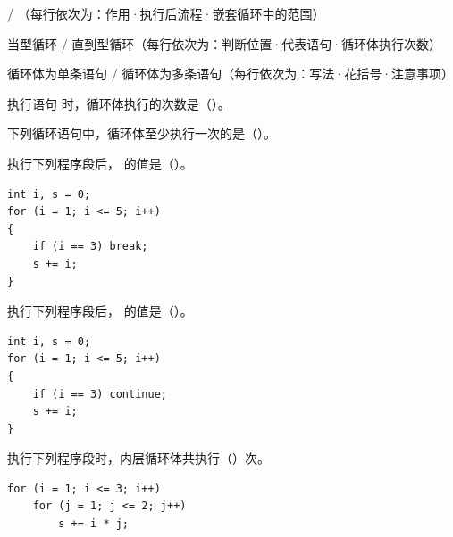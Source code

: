 \documentclass[a4paper,11pt]{article}
\begin{document}
\begin{contrast}{ / （每行依次为：作用·执行后流程·嵌套循环中的范围）}
\end{contrast}

\begin{contrast}{当型循环 / 直到型循环（每行依次为：判断位置·代表语句·循环体执行次数）}
\end{contrast}

\begin{contrast}{循环体为单条语句 / 循环体为多条语句（每行依次为：写法·花括号·注意事项）}
\end{contrast}


\q 执行语句  时，循环体执行的次数是（\quad）。

\q 下列循环语句中，循环体至少执行一次的是（\quad）。

\q 执行下列程序段后， 的值是（\quad）。
\begin{lstlisting}[language={[custom]C}]
int i, s = 0;
for (i = 1; i <= 5; i++)
{
    if (i == 3) break;
    s += i;
}
\end{lstlisting}

\q 执行下列程序段后， 的值是（\quad）。
\begin{lstlisting}[language={[custom]C}]
int i, s = 0;
for (i = 1; i <= 5; i++)
{
    if (i == 3) continue;
    s += i;
}
\end{lstlisting}

\q 执行下列程序段时，内层循环体共执行（\quad）次。
\begin{lstlisting}[language={[custom]C}]
for (i = 1; i <= 3; i++)
    for (j = 1; j <= 2; j++)
        s += i * j;
\end{lstlisting}
\end{document}
